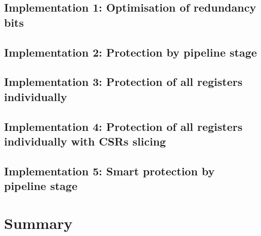     \subsection{Implementation 1: Optimisation of redundancy bits}

    \subsection{Implementation 2: Protection by pipeline stage}

    \subsection{Implementation 3: Protection of all registers individually}

    \subsection{Implementation 4: Protection of all registers individually with CSRs slicing}

    \subsection{Implementation 5: Smart protection by pipeline stage}




\section{Summary}

